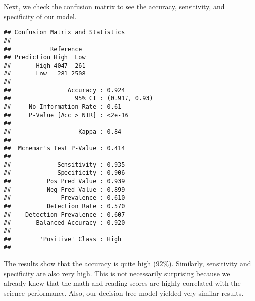 \documentclass[
]{book}
\newenvironment{Shaded}{\begin{snugshade}}{\end{snugshade}}
\newcommand{\AttributeTok}[1]{\textcolor[rgb]{0.77,0.63,0.00}{#1}}
\newcommand{\FunctionTok}[1]{\textcolor[rgb]{0.00,0.00,0.00}{#1}}
\newcommand{\NormalTok}[1]{#1}
\newcommand{\OtherTok}[1]{\textcolor[rgb]{0.56,0.35,0.01}{#1}}
\newcommand{\SpecialCharTok}[1]{\textcolor[rgb]{0.00,0.00,0.00}{#1}}
\newcommand{\StringTok}[1]{\textcolor[rgb]{0.31,0.60,0.02}{#1}}
\begin{document}
Next, we check the confusion matrix to see the accuracy, sensitivity, and specificity of our model.

\begin{Shaded}
\end{Shaded}

\begin{verbatim}
## Confusion Matrix and Statistics
## 
##           Reference
## Prediction High  Low
##       High 4047  261
##       Low   281 2508
##                                        
##                Accuracy : 0.924        
##                  95% CI : (0.917, 0.93)
##     No Information Rate : 0.61         
##     P-Value [Acc > NIR] : <2e-16       
##                                        
##                   Kappa : 0.84         
##                                        
##  Mcnemar's Test P-Value : 0.414        
##                                        
##             Sensitivity : 0.935        
##             Specificity : 0.906        
##          Pos Pred Value : 0.939        
##          Neg Pred Value : 0.899        
##              Prevalence : 0.610        
##          Detection Rate : 0.570        
##    Detection Prevalence : 0.607        
##       Balanced Accuracy : 0.920        
##                                        
##        'Positive' Class : High         
## 
\end{verbatim}

The results show that the accuracy is quite high (\(92\%\)). Similarly, sensitivity and specificity are also very high. This is not necessarily surprising because we already knew that the math and reading scores are highly correlated with the science performance. Also, our decision tree model yielded very similar results.
\end{document}
